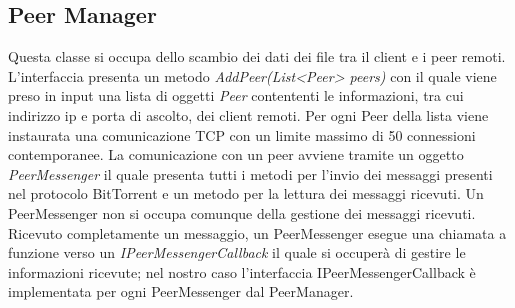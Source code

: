\documentclass[a4]{book}
\begin{document}
\subsection{Peer Manager}
Questa classe si occupa dello scambio dei dati dei file tra il client e i peer remoti.\newline
L'interfaccia presenta un metodo \textit{AddPeer(List<Peer> peers)} con il quale viene preso in input una lista di oggetti \textit{Peer} contententi le informazioni, tra cui indirizzo ip e porta di ascolto, dei client remoti.\newline
Per ogni Peer della lista viene instaurata una comunicazione TCP con un limite massimo di 50 connessioni contemporanee. La comunicazione con un peer avviene tramite un oggetto \textit{PeerMessenger} il quale presenta tutti i metodi per l'invio dei messaggi presenti nel protocolo BitTorrent e un metodo per la lettura dei messaggi ricevuti.\newline
Un PeerMessenger non si occupa comunque della gestione dei messaggi ricevuti. Ricevuto completamente un messaggio, un PeerMessenger esegue una chiamata a funzione verso un \textit{IPeerMessengerCallback} il quale si occuperà di gestire le informazioni ricevute; nel nostro caso l'interfaccia IPeerMessengerCallback è implementata per ogni PeerMessenger dal PeerManager.\newline
\end{document}
